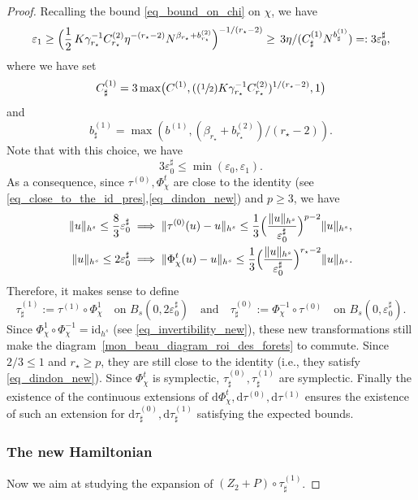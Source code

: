 \documentclass[11pt]{article}
\newcommand{\ie}{i.e.,\xspace}
\newcommand{\Psfrac}[2]{(\sfrac{#1}{#2})}
\theoremstyle{definition}
\begin{document}
\begin{proof}
Recalling the bound \eqref{eq_bound_on_chi} on $\chi$, we have
\[
\varepsilon_1 \geq \Bigl(\frac12\, K \gamma_{r_\star}^{-1} C_{r_\star}^{(2)} \eta^{-(r_\star-2)} N^{\beta_{r_\star}+ b_{r_\star}^{(2)}}\Bigr)^{-1/(r_{\star}-2)} \geq \, 3 \eta /(C^{(1)}_\sharp N^{b^{(1)}_\sharp})=: 3 \varepsilon_0^\sharp,
\]
where we have set
\[
C^{(1)}_\sharp = 3 \max\bigl(C^{(1)}, (\Psfrac12 K \gamma_{r_\star}^{-1} C_{r_\star}^{(2)})^{1/(r_\star-2)},1\bigr)
\]
and
\[
b^{(1)}_{\sharp}=\max(b^{(1)},(\beta_{r_\star}+ b_{r_\star}^{(2)})/(r_{\star}-2)).
\]
Note that with this choice, we have
\[
3 \varepsilon_0^\sharp \leq \min(\varepsilon_0,\varepsilon_1).
\]
As a consequence, since $\tau^{(0)},\Phi_\chi^t$ are close to the identity (see \eqref{eq_close_to_the_id_pres},\eqref{eq_dindon_new}) and $p\geq 3$, we have
\begin{align*}
\| u \|_{h^s} \leq \frac83 \varepsilon_0^\sharp &\implies \|\tau^{(0)}(u)-u\|_{h^s} \leq \frac13 \Bigl(\frac{\|u\|_{h^s}}{\varepsilon_0^\sharp} \Bigr)^{p-2} \|u\|_{h^s},\\
\| u \|_{h^s} \leq 2 \varepsilon_0^\sharp &\implies \|\Phi_\chi^t(u)-u\|_{h^s} \leq \frac13 \Bigl(\frac{\|u\|_{h^s}}{\varepsilon_0^\sharp} \Bigr)^{r_\star-2} \|u\|_{h^s}.
\end{align*}
Therefore, it makes sense to define
\[
\tau^{(1)}_\sharp:= \tau^{(1)} \circ \Phi_\chi^1\quad \text{on } B_s(0,2 \varepsilon_0^\sharp)\quad \text{and} \quad \tau^{(0)}_\sharp:= \Phi_\chi^{-1}\circ \tau^{(0)}\quad \text{on } B_s(0, \varepsilon_0^\sharp).
\]
Since $\Phi_\chi^{1} \circ \Phi_\chi^{-1} =\mathrm{id}_{h^s}$ (see \eqref{eq_invertibility_new}), these new transformations still make the diagram~\eqref{mon_beau_diagram_roi_des_forets} to commute. Since $2/3\leq 1$ and $r_\star \geq p$, they are still close to the identity (\ie they satisfy \eqref{eq_dindon_new}). Since $\Phi_\chi^t$ is symplectic, $\tau^{(0)}_\sharp,\tau^{(1)}_\sharp$ are symplectic. Finally the existence of the continuous extensions of $\mathrm{d}\Phi_\chi^t,\mathrm{d} \tau^{(0)}, \mathrm{d} \tau^{(1)}$ ensures the existence of such an extension for $\mathrm{d}\tau^{(0)}_\sharp,\mathrm{d}\tau^{(1)}_\sharp$ satisfying the expected bounds.

\subsubsection*{The new Hamiltonian}
Now we aim at studying the expansion of $(Z_2+P)\circ \tau^{(1)}_\sharp$.


\end{proof}
\end{document}
